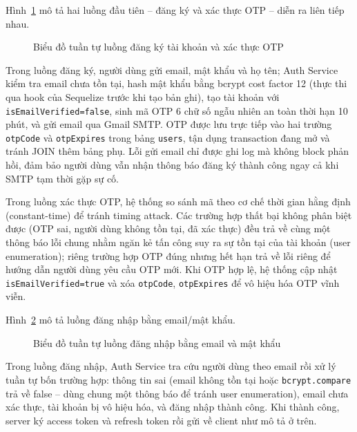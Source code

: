 \clearpage
Hình~\ref{fig:seq_auth_register} mô tả hai luồng đầu tiên -- đăng ký và xác thực OTP -- diễn ra liên tiếp nhau.

\begin{figure}[H]
  \centering
  \caption{Biểu đồ tuần tự luồng đăng ký tài khoản và xác thực OTP}
  \label{fig:seq_auth_register}
\end{figure}

Trong luồng đăng ký, người dùng gửi email, mật khẩu và họ tên; Auth Service kiểm tra email chưa tồn tại, hash mật khẩu bằng bcrypt cost factor 12 (thực thi qua hook của Sequelize trước khi tạo bản ghi), tạo tài khoản với \texttt{isEmailVerified=false}, sinh mã OTP 6 chữ số ngẫu nhiên an toàn thời hạn 10 phút, và gửi email qua Gmail SMTP. OTP được lưu trực tiếp vào hai trường \texttt{otpCode} và \texttt{otpExpires} trong bảng \texttt{users}, tận dụng transaction đang mở và tránh JOIN thêm bảng phụ. Lỗi gửi email chỉ được ghi log mà không block phản hồi, đảm bảo người dùng vẫn nhận thông báo đăng ký thành công ngay cả khi SMTP tạm thời gặp sự cố.

Trong luồng xác thực OTP, hệ thống so sánh mã theo cơ chế thời gian hằng định (constant-time) để tránh timing attack. Các trường hợp thất bại không phân biệt được (OTP sai, người dùng không tồn tại, đã xác thực) đều trả về cùng một thông báo lỗi chung nhằm ngăn kẻ tấn công suy ra sự tồn tại của tài khoản (user enumeration); riêng trường hợp OTP đúng nhưng hết hạn trả về lỗi riêng để hướng dẫn người dùng yêu cầu OTP mới. Khi OTP hợp lệ, hệ thống cập nhật \texttt{isEmailVerified=true} và xóa \texttt{otpCode}, \texttt{otpExpires} để vô hiệu hóa OTP vĩnh viễn.

\clearpage
Hình~\ref{fig:seq_auth_login} mô tả luồng đăng nhập bằng email\slash mật khẩu.

\begin{figure}[H]
  \centering
  \caption{Biểu đồ tuần tự luồng đăng nhập bằng email và mật khẩu}
  \label{fig:seq_auth_login}
\end{figure}

\begin{sloppypar}
Trong luồng đăng nhập, Auth Service tra cứu người dùng theo email rồi xử lý tuần tự bốn trường hợp: thông tin sai (email không tồn tại hoặc \texttt{bcrypt.compare} trả về false -- dùng chung một thông báo để tránh user enumeration), email chưa xác thực, tài khoản bị vô hiệu hóa, và đăng nhập thành công. Khi thành công, server ký access token và refresh token rồi gửi về client như mô tả ở trên.
\end{sloppypar}

